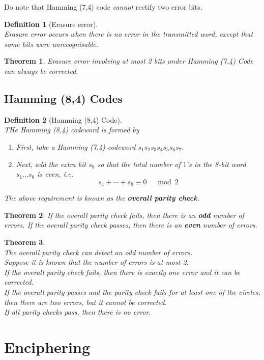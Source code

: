 \documentclass[12pt]{article}
\newtheorem{definition}{Definition}[section]
\newtheorem{theorem}{Theorem}[section]
\theoremstyle{definition}
\begin{document}
Do note that Hamming (7,4) code \textit{cannot} rectify two error bits.
\begin{definition}[Erasure error]
\hfill\\\normalfont Erasure error occurs when there is \textit{no} error in the transmitted word, except that some bits were unrecognisable.
\end{definition}
\begin{theorem}\normalfont Erasure error involving at most 2 bits under Hamming (7,4) Code can \textit{always} be corrected.
\end{theorem}
\subsection{Hamming (8,4) Codes}
\begin{definition}[Hamming (8,4) Code]
\hfill\\\normalfont THe Hamming (8,4) codeword is formed by
\begin{enumerate}
  \item First, take a Hamming (7,4) codeword $s_1s_2s_3s_4s_5s_6s_7$.
  \item Next, add the extra bit $s_8$ so that the total number of $1$'s in the 8-bit word $s_1\ldots s_8$ is even, i.e.
  \[
s_1+\cdots+s_8\equiv 0\;\;\;\mod 2
  \]
\end{enumerate}
The above requirement is known as the \textbf{overall parity check}.
\end{definition}
\begin{theorem}\normalfont If the overall parity check fails, then there is an \textbf{odd} number of errors. If the overall parity check passes, then there is an \textbf{even} number of errors.
\end{theorem}
\begin{theorem}\hfill\\\normalfont The overall parity check can detect an odd number of errors. \\Suppose it is known that the number of errors is at most 2.\\If the overall parity check fails, then there is exactly one error and it can be corrected.\\If the overall parity passes and the parity check fails for at least one of the circles, then there are two errors, but it \textit{cannot} be corrected.\\If all parity checks pass, then there is no error.
\end{theorem}
\clearpage
\section{Enciphering}
\end{document}

